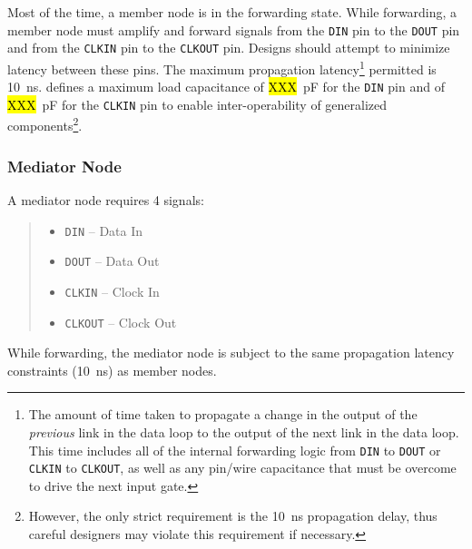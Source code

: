 \noindent
Most of the time, a member node is in the {\sc forwarding} state. While
forwarding, a member node must amplify and forward signals from the {\tt DIN}
pin to the {\tt DOUT} pin and from the {\tt CLKIN} pin to the {\tt CLKOUT} pin.
Designs should attempt to minimize latency between these pins. The maximum
propagation latency\footnote{
  The amount of time taken to propagate a change in the output of the {\em
  previous} link in the data loop to the output of the next link in the data
  loop. This time includes all of the internal forwarding logic from {\tt DIN}
  to {\tt DOUT} or {\tt CLKIN} to {\tt CLKOUT}, as well as any pin/wire
  capacitance that must be overcome to drive the next input gate.
  }
permitted is 10~ns. \bus defines a maximum load capacitance of \hl{XXX}~pF for
the {\tt DIN} pin and of \hl{XXX}~pF for the {\tt CLKIN} pin to enable
inter-operability of generalized components\footnote{
  However, the only strict requirement is the 10~ns propagation delay, thus
  careful designers may violate this requirement if necessary.
  }.

\subsubsection{Mediator Node}
\label{sec:physical-mediator}
A mediator node requires 4 signals:

\begin{quote}
\begin{itemize}
  \item[] {\tt DIN} -- Data In
  \item[] {\tt DOUT} -- Data Out
  \item[] {\tt CLKIN} -- Clock In
  \item[] {\tt CLKOUT} -- Clock Out
\end{itemize}
\end{quote}

\noindent
While forwarding, the mediator node is subject to the same propagation latency
constraints (10~ns) as member nodes.


